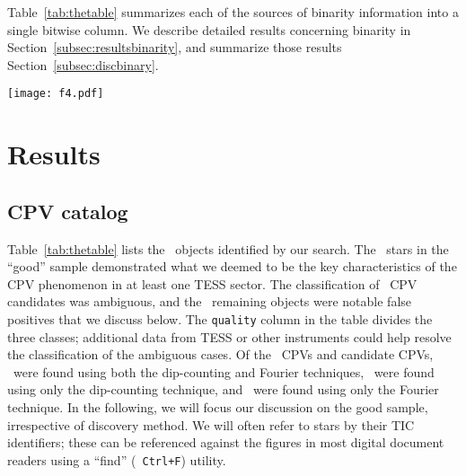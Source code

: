 \documentclass[11pt,twocolumn,tighten]{aastex63}
\begin{document}
Table~\ref{tab:thetable} summarizes each of the sources of binarity
information into a single bitwise column.  We describe detailed
results concerning binarity in Section~\ref{subsec:resultsbinarity},
and summarize those results Section~\ref{subsec:discbinary}.




\begin{figure*}[!tp]
	\begin{center}
		\centering
		\texttt{[image: f4.pdf]}
    \vspace{-0.3cm}
		\caption{
      {\bf CPVs found in the TESS 2-minute data.}
      Phased TESS light curves over one month are shown for \ngoods\
      CPVs in the high quality sample.  Gray are raw 2-minute data;
      black bins to 300 points per cycle.  Objects are ordered such
      that sources with the most TESS data available are on top (see
      Section~\ref{sec:catalog}).  Zero phase is chosen to correspond
      to minimum light.  Each panel is labeled by the TIC identifier,
      the TESS sector number, the period in hours, and the three-bit
      binarity flag from Table~\ref{tab:thetable}, which denotes Gaia
      DR3 \texttt{radial\_velocity\_error} outliers (bit 1), Gaia DR3
      \texttt{ruwe} outliers (bit 2), and stars with secondary TESS
      periods (bit 3). 
		}
		\label{fig:cpvs}
	\end{center}
\end{figure*}



\section{Results}
\label{sec:results}

\subsection{CPV catalog}
\label{sec:catalog}

Table~\ref{tab:thetable} lists the \nallcands\ objects identified by
our search.  The \ngoods\ stars in the ``good'' sample demonstrated
what we deemed to be the key characteristics of the CPV phenomenon in
at least one TESS sector.  The classification of \nmaybes\ CPV
candidates was ambiguous, and the \ndebunked\ remaining objects were
notable false positives that we discuss below.  The \texttt{quality}
column in the table divides the three classes; additional data from
TESS or other instruments could help resolve the classification of the
ambiguous cases.   Of the \ncqvsnodebunked\ CPVs and candidate CPVs,
\nbothdipfourier\ were found using both the dip-counting and Fourier
techniques, \nyesdipnofourier\ were found using only the dip-counting
technique, and \nyesfouriernodip\ were found using only the Fourier
technique.  In the following, we will focus our discussion on the good
sample, irrespective of discovery method.  We will often refer to
stars by their TIC identifiers; these can be referenced against the
figures in most digital document readers using a ``find'' ({\tt
Ctrl+F}) utility.
\end{document}
